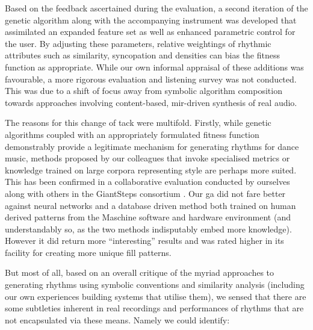 {{Based on the feedback ascertained during the evaluation, a second iteration of the genetic algorithm along with the accompanying instrument was developed that assimilated an expanded feature set as well as enhanced parametric control for the user. By adjusting these parameters, relative weightings of rhythmic attributes such as similarity, syncopation and densities can bias the fitness function as appropriate. While our own informal appraisal of these additions was favourable, a more rigorous evaluation and listening survey was not conducted. This was due to a shift of focus away from symbolic algorithm composition towards approaches involving content-based, \acrshort{mir}-driven synthesis of real audio.

The reasons for this change of tack were multifold. Firstly, while genetic algorithms coupled with an appropriately formulated fitness function demonstrably provide a legitimate mechanism for generating rhythms for dance music, methods proposed by our colleagues that invoke specialised metrics \citep{Marin2015} or knowledge trained on large corpora representing style \citep{Jorda2016} are perhaps more suited. This has been confirmed in a collaborative evaluation conducted by ourselves along with others in the GiantSteps consortium \citep{Vogl2016}. Our \acrshort{ga} did not fare better against neural networks and a database driven method both trained on human derived patterns from the Maschine software and hardware environment (and understandably so, as the two methods indisputably embed more knowledge). However it did return more ``interesting'' results and was rated higher in its facility for creating more unique fill patterns. 

%

But most of all, based on an overall critique of the myriad approaches to generating rhythms using symbolic conventions and similarity analysis (including our own experiences building systems that utilise them), we sensed that there are some subtleties inherent in real recordings and performances of rhythms that are not encapsulated via these means. Namely we could identify:

}}
